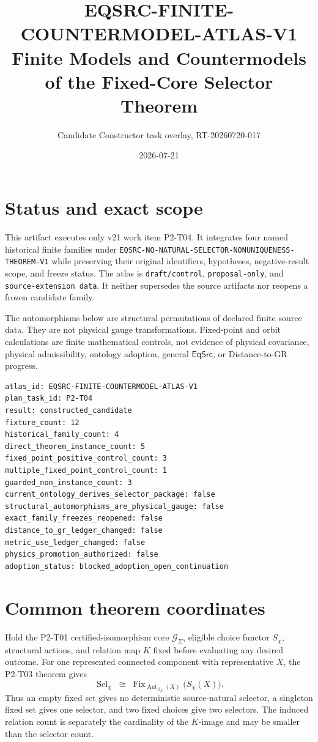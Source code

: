 \documentclass[11pt]{article}
\title{EQSRC-FINITE-COUNTERMODEL-ATLAS-V1\\
Finite Models and Countermodels of the Fixed-Core Selector Theorem}
\author{Candidate Constructor task overlay, RT-20260720-017}
\date{2026-07-21}
\newcommand{\Fix}{\operatorname{Fix}}
\newcommand{\Aut}{\operatorname{Aut}}
\newcommand{\Sel}{\operatorname{Sel}}
\newcommand{\Eqs}{\mathsf{EqSrc}}
\begin{document}
\maketitle

\section{Status and exact scope}

This artifact executes only v21 work item P2-T04. It integrates four named
historical finite families under
\texttt{EQSRC-NO-NATURAL-SELECTOR-NONUNIQUENESS-THEOREM-V1} while preserving
their original identifiers, hypotheses, negative-result scope, and freeze
status. The atlas is \texttt{draft/control}, \texttt{proposal-only}, and
\texttt{source-extension data}. It neither supersedes the source artifacts nor
reopens a frozen candidate family.

The automorphisms below are structural permutations of declared finite source
data. They are not physical gauge transformations. Fixed-point and orbit
calculations are finite mathematical controls, not evidence of physical
covariance, physical admissibility, ontology adoption, general \(\Eqs\), or
Distance-to-GR progress.

\begin{verbatim}
atlas_id: EQSRC-FINITE-COUNTERMODEL-ATLAS-V1
plan_task_id: P2-T04
result: constructed_candidate
fixture_count: 12
historical_family_count: 4
direct_theorem_instance_count: 5
fixed_point_positive_control_count: 3
multiple_fixed_point_control_count: 1
guarded_non_instance_count: 3
current_ontology_derives_selector_package: false
structural_automorphisms_are_physical_gauge: false
exact_family_freezes_reopened: false
distance_to_gr_ledger_changed: false
metric_use_ledger_changed: false
physics_promotion_authorized: false
adoption_status: blocked_adoption_open_continuation
\end{verbatim}

\section{Common theorem coordinates}

Hold the P2-T01 certified-isomorphism core \(\mathcal G_\Sigma\), eligible
choice functor \(S_\chi\), structural actions, and relation map \(K\) fixed
before evaluating any desired outcome. For one represented connected
component with representative \(X\), the P2-T03 theorem gives
\[
 \Sel_\chi\;\cong\;
 \Fix_{\Aut_{\mathcal G_\Sigma}(X)}\!\bigl(S_\chi(X)\bigr).
\]
Thus an empty fixed set gives no deterministic source-natural selector, a
singleton fixed set gives one selector, and two fixed choices give two
selectors. The induced relation count is separately the cardinality of the
\(K\)-image and may be smaller than the selector count.
\end{document}
